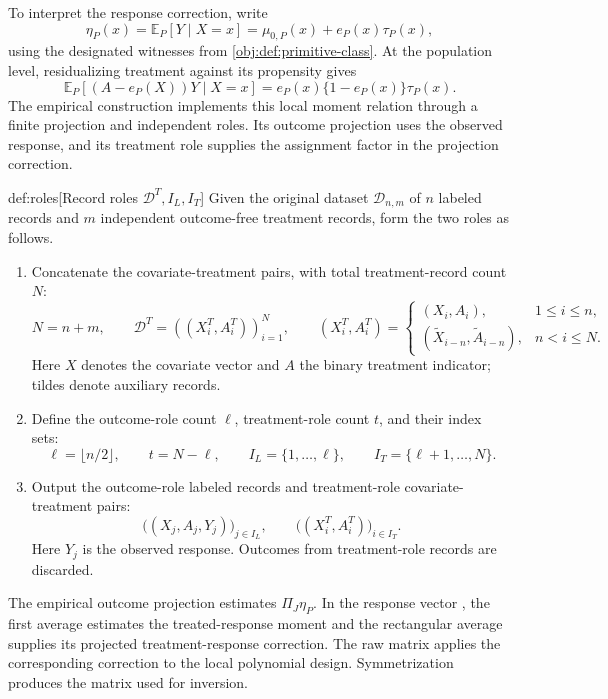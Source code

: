 \documentclass[11pt]{article}
\begin{document}
To interpret the response correction, write
\[
\eta_P(x)=\mathbb E_P[Y\mid X=x]
=\mu_{0,P}(x)+e_P(x)\tau_P(x),
\]
using the designated witnesses from \cref{obj:def:primitive-class}. At the population level, residualizing treatment against its propensity gives
\[
\mathbb E_P[(A-e_P(X))Y\mid X=x]
=e_P(x)\{1-e_P(x)\}\tau_P(x).
\]
The empirical construction implements this local moment relation through a finite projection and independent roles. Its outcome projection uses the observed response, and its treatment role supplies the assignment factor in the projection correction.

\begin{algorithmv}{def:roles}[Record roles \(\mathcal D^T,I_L,I_T\)]
Given the original dataset \(\mathcal D_{n,m}\) of \(n\) labeled records and \(m\) independent outcome-free treatment records, form the two roles as follows.
\begin{enumerate}
\item Concatenate the covariate-treatment pairs, with total treatment-record count \(N\):
\[
N=n+m,\qquad
\mathcal D^T=((X_i^T,A_i^T))_{i=1}^N,
\qquad
(X_i^T,A_i^T)=
\begin{cases}
(X_i,A_i),&1\le i\le n,\\
(\widetilde X_{i-n},\widetilde A_{i-n}),&n<i\le N.
\end{cases}
\]
Here \(X\) denotes the covariate vector and \(A\) the binary treatment indicator; tildes denote auxiliary records.
\item Define the outcome-role count \(\ell\), treatment-role count \(t\), and their index sets:
\[
\ell=\lfloor n/2\rfloor,\qquad
t=N-\ell,\qquad
I_L=\{1,\ldots,\ell\},\qquad
I_T=\{\ell+1,\ldots,N\}.
\]
\item Output the outcome-role labeled records and treatment-role covariate-treatment pairs:
\[
\bigl((X_j,A_j,Y_j)\bigr)_{j\in I_L},
\qquad
\bigl((X_i^T,A_i^T)\bigr)_{i\in I_T}.
\]
Here \(Y_j\) is the observed response. Outcomes from treatment-role records are discarded.
\end{enumerate}
\end{algorithmv}

The empirical outcome projection  estimates \(\Pi_J\eta_P\). In the response vector , the first average estimates the treated-response moment and the rectangular average supplies its projected treatment-response correction. The raw matrix  applies the corresponding correction to the local polynomial design. Symmetrization produces the matrix  used for inversion.
\end{document}
